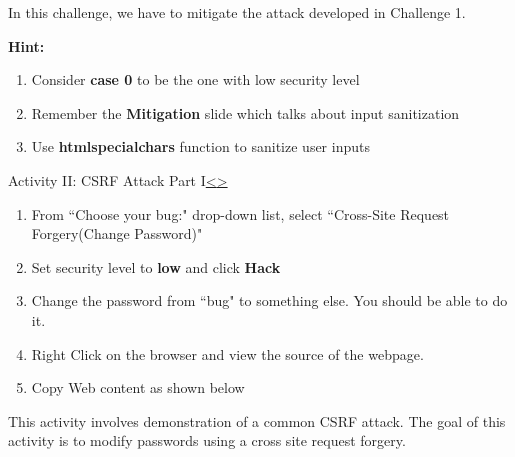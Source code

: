 \documentclass[12pt]{extarticle}
\newenvironment{instructionblock}{\Large\bgroup}{\egroup}
\begin{document}
\vspace{4mm}
\noindent
In this challenge, we have to mitigate the attack developed in Challenge 1.

\vspace{2mm}
\noindent
\textbf{Hint:}
\begin{enumerate}
	\item Consider \textbf{case 0} to be the one with low security level
	\item Remember the \textbf{Mitigation} slide which talks about input sanitization
	\item Use \textbf{htmlspecialchars} function to sanitize user inputs 
\end{enumerate}




\pagebreak
\begin{slide}{Activity II: CSRF Attack Part I}{\hyperref[slide 14]{\textless}\hyperref[slide 16]{\textgreater}}
	\begin{instructionblock}
		\begin{enumerate}
						\item From ``Choose your bug:" drop-down list, select ``Cross-Site Request Forgery(Change Password)"
						\item Set security level to \textbf{low} and click \textbf{Hack}
						\item Change the password from ``bug" to something else. You should be able to do it.
						\item Right Click on the browser and view the source of the webpage.
						\item Copy Web content as shown below
						
		\end{enumerate}
	\end{instructionblock}	
\end{slide}

\vspace{4mm}
\noindent
This activity involves demonstration of a common CSRF attack. The goal of this activity is to modify passwords using a cross site request forgery.

\vspace{2mm}
\noindent
\vfill
 
\end{document}
